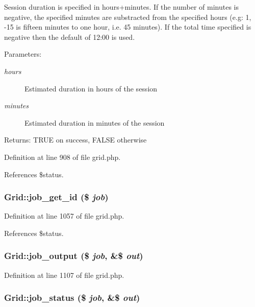 Session duration is specified in hours+minutes. If the number of minutes is negative, the specified minutes are substracted from the specified hours (e.g: 1, -15 is fifteen minutes to one hour, i.e. 45 minutes). If the total time specified is negative then the default of 12:00 is used.

\begin{Desc}
\item[Parameters:]
\begin{description}
\item[{\em hours}]Estimated duration in hours of the session\item[{\em minutes}]Estimated duration in minutes of the session\end{description}
\end{Desc}
\begin{Desc}
\item[Returns:]TRUE on success, FALSE otherwise \end{Desc}


Definition at line 908 of file grid.php.

References \$status.
\subsubsection{\setlength{\rightskip}{0pt plus 5cm}Grid::job\_\-get\_\-id (\$ {\em job})}\label{classGrid_a23}




Definition at line 1057 of file grid.php.

References \$status.
\subsubsection{\setlength{\rightskip}{0pt plus 5cm}Grid::job\_\-output (\$ {\em job}, \&\$ {\em out})}\label{classGrid_a25}




Definition at line 1107 of file grid.php.
\subsubsection{\setlength{\rightskip}{0pt plus 5cm}Grid::job\_\-status (\$ {\em job}, \&\$ {\em out})}\label{classGrid_a24}




